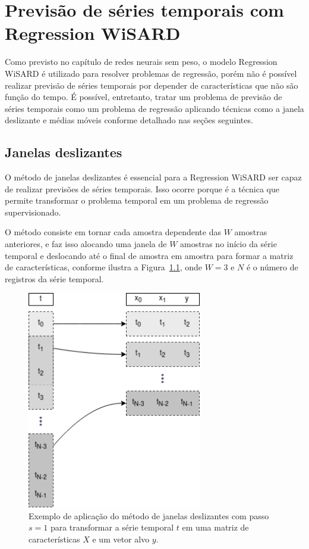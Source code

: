 \chapter{Previsão de séries temporais com Regression WiSARD}
Como previsto no capítulo de redes neurais sem peso, o modelo Regression WiSARD é utilizado para resolver problemas de regressão, porém não é possível realizar previsão de séries temporais por depender de características que não são função do tempo. É possível, entretanto, tratar um problema de previsão de séries temporais como um problema de regressão aplicando técnicas como a janela deslizante e médias móveis conforme detalhado nas seções seguintes.

\section{Janelas deslizantes} \label{sec:sliding_window}
O método de janelas deslizantes é essencial para a Regression WiSARD ser capaz de realizar previsões de séries temporais. Isso ocorre porque é a técnica que permite transformar o problema temporal em um problema de regressão supervisionado.

O método consiste em tornar cada amostra dependente das $W$ amostras anteriores, e faz isso alocando uma janela de $W$ amostras no início da série temporal e deslocando até o final de amostra em amostra para formar a matriz de características, conforme ilustra a Figura~\ref{fig:sliding_window}, onde $W=3$ e $N$ é o número de registros da série temporal.

\begin{figure}[!htp]
    \centering
    \includegraphics[width=3.0in]{img/sliding_window.png}
    \caption{Exemplo de aplicação do método de janelas deslizantes com passo $s=1$  para transformar a série temporal $t$ em uma matriz de características $X$ e um vetor alvo $y$. }
    \label{fig:sliding_window}
\end{figure}

